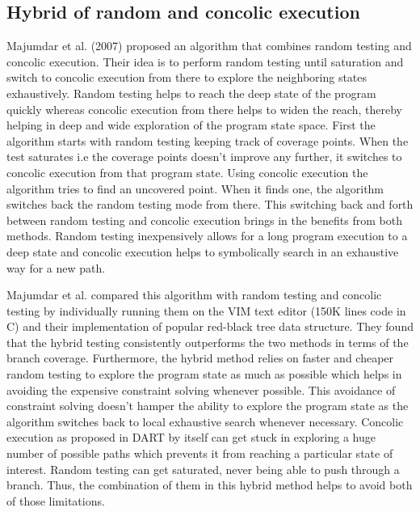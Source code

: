 \documentclass[ runningheads,
               a4paper]{llncs}
\begin{document}


\subsection{Hybrid of random and concolic execution}
Majumdar et al. (2007) \cite{majumdar2007hybrid} proposed an algorithm that combines random testing and concolic execution. Their idea is to perform random testing until saturation and switch to concolic execution from there to explore the neighboring states exhaustively. Random testing helps to reach the deep state of the program quickly whereas concolic execution from there helps to widen the reach, thereby helping in deep and wide exploration of the program state space. First the algorithm starts with random testing keeping track of coverage points. When the test saturates i.e the coverage points doesn't improve any further, it switches to concolic execution from that program state. Using concolic execution the algorithm tries to find an uncovered point. When it finds one, the algorithm switches back the random testing mode from there. This switching back and forth between random testing and concolic execution brings in the benefits from both methods. Random testing inexpensively allows for a long program execution to a deep state and concolic execution helps to symbolically search in an exhaustive way for a new path.


Majumdar et al. \cite{majumdar2007hybrid} compared this algorithm with random testing and concolic testing by individually running them on the VIM text editor (150K lines code in C) and their implementation of popular red-black tree data structure. They found that the hybrid testing consistently outperforms the two methods in terms of the branch coverage. Furthermore, the hybrid method relies on faster and cheaper random testing to explore the program state as much as possible which helps in avoiding the expensive constraint solving whenever possible. This avoidance of constraint solving doesn't hamper the ability to explore the program state as the algorithm switches back to local exhaustive search whenever necessary. Concolic execution as proposed in DART \cite{godefroid2005dart} by itself can get stuck in exploring a huge number of possible paths which prevents it from reaching a particular state of interest. Random testing can get saturated, never being able to push through a branch. Thus, the combination of them in this hybrid method helps to avoid both of those limitations.
\end{document}
